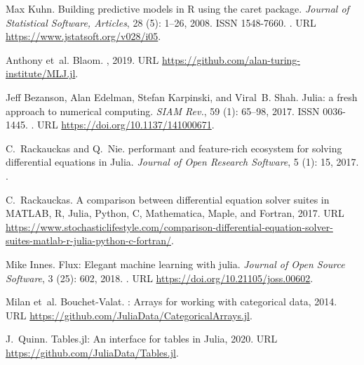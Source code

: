 \documentclass{article}
\begin{document}
\begin{thebibliography}{18}
Max Kuhn.
\newblock Building predictive models in {R} using the caret package.
\newblock \emph{Journal of Statistical Software, Articles}, 28
  (5): 1--26, 2008.
\newblock ISSN 1548-7660.
\newblock {}.
\newblock URL \url{https://www.jstatsoft.org/v028/i05}.

Anthony et~al. Blaom.
, 2019.
\newblock URL \url{https://github.com/alan-turing-institute/MLJ.jl}.

Jeff Bezanson, Alan Edelman, Stefan Karpinski, and Viral~B. Shah.
\newblock Julia: a fresh approach to numerical computing.
\newblock \emph{SIAM Rev.}, 59 (1): 65--98, 2017.
\newblock ISSN 0036-1445.
\newblock {}.
\newblock URL \url{https://doi.org/10.1137/141000671}.

C.~Rackauckas and Q.~Nie.
 performant and feature-rich
  ecosystem for solving differential equations in {J}ulia.
\newblock \emph{Journal of Open Research Software}, 5 (1):
  15, 2017.
\newblock {}.

C.~Rackauckas.
\newblock A comparison between differential equation solver suites in {MATLAB},
  {R}, {J}ulia, {P}ython, {C}, {M}athematica, {M}aple, and {F}ortran, 2017.
\newblock URL
  \url{https://www.stochasticlifestyle.com/comparison-differential-equation-solver-suites-matlab-r-julia-python-c-fortran/}.

Mike Innes.
\newblock Flux: Elegant machine learning with julia.
\newblock \emph{Journal of Open Source Software}, 3 (25):
  602, 2018.
\newblock {}.
\newblock URL \url{https://doi.org/10.21105/joss.00602}.

Milan et~al. Bouchet-Valat.
: {A}rrays for working with categorical data,
  2014.
\newblock URL \url{https://github.com/JuliaData/CategoricalArrays.jl}.

J.~Quinn.
\newblock Tables.jl: {A}n interface for tables in {J}ulia, 2020.
\newblock URL \url{https://github.com/JuliaData/Tables.jl}.


\end{thebibliography}
\end{document}

